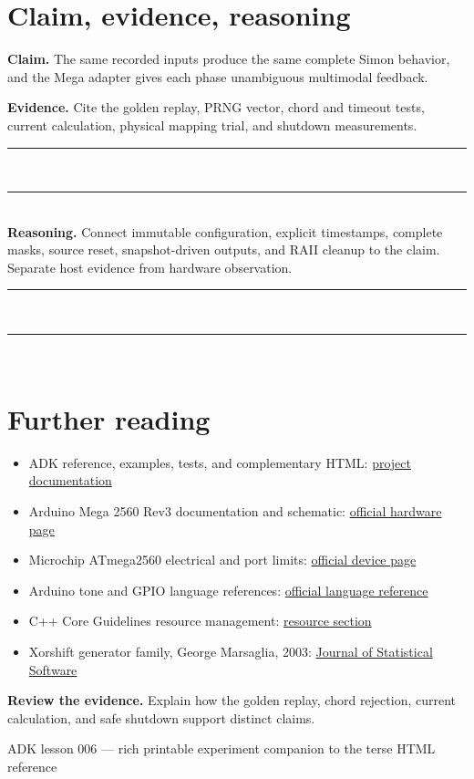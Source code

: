 \documentclass[11pt]{article}
\newcommand{\blank}[1]{\rule{#1}{0.4pt}}
\begin{document}
\section{Claim, evidence, reasoning}

\textbf{Claim.} The same recorded inputs produce the same complete Simon
behavior, and the Mega adapter gives each phase unambiguous multimodal feedback.

\textbf{Evidence.} Cite the golden replay, PRNG vector, chord and timeout tests,
current calculation, physical mapping trial, and shutdown measurements.\\[3pt]
\blank{0.98\linewidth}\\[8pt]
\blank{0.98\linewidth}\\[8pt]

\textbf{Reasoning.} Connect immutable configuration, explicit timestamps,
complete masks, source reset, snapshot-driven outputs, and RAII cleanup to the
claim. Separate host evidence from hardware observation.\\[3pt]
\blank{0.98\linewidth}\\[8pt]
\blank{0.98\linewidth}\\[8pt]

\section{Further reading}

\begin{itemize}
  \item ADK reference, examples, tests, and complementary HTML:
        \href{https://spincyc.github.io/adk/}{project documentation}
  \item Arduino Mega 2560 Rev3 documentation and schematic:
        \href{https://docs.arduino.cc/hardware/mega-2560/}{official hardware page}
  \item Microchip ATmega2560 electrical and port limits:
        \href{https://www.microchip.com/en-us/product/ATmega2560}{official device page}
  \item Arduino tone and GPIO language references:
        \href{https://docs.arduino.cc/language-reference/}{official language reference}
  \item C++ Core Guidelines resource management:
        \href{https://isocpp.github.io/CppCoreGuidelines/CppCoreGuidelines\#S-resource}{resource section}
  \item Xorshift generator family, George Marsaglia, 2003:
        \href{https://www.jstatsoft.org/article/view/v008i14}{Journal of Statistical Software}
\end{itemize}

\textbf{Review the evidence.}
Explain how the golden replay, chord rejection, current calculation, and safe
shutdown support distinct claims.

\vfill
\begin{center}
\small ADK lesson 006 --- rich printable experiment companion to the terse HTML reference
\end{center}
\end{document}
